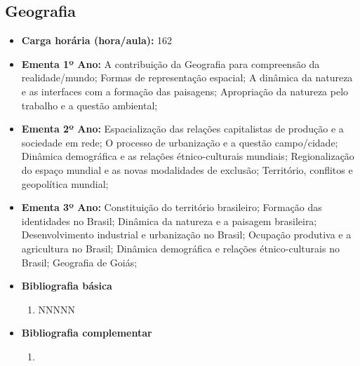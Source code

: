 \documentclass[11pt,fleqn]{book} %
\begin{document}
\subsection{Geografia}\label{disc:geografia}
\begin{itemize}
	\item \textbf{Carga horária (hora/aula):} 162
	\item \textbf{Ementa 1º Ano:} 
	A contribuição da Geografia para compreensão da realidade/mundo;
	Formas de representação espacial;
	A dinâmica da natureza e as interfaces com a formação das paisagens;
	Apropriação da natureza pelo trabalho e a questão ambiental;
	\item \textbf{Ementa 2º Ano:} 	
	Espacialização das relações capitalistas de produção e a sociedade em rede;
	O processo de urbanização e a questão campo/cidade;
	Dinâmica demográfica e as relações étnico-culturais mundiais;
	Regionalização do espaço mundial e as novas modalidades de exclusão;
	Território, conflitos e geopolítica mundial;
	\item \textbf{Ementa 3º Ano:} 	
	Constituição do território brasileiro;
	Formação das identidades no Brasil; 
	Dinâmica da natureza e a paisagem brasileira;
	Desenvolvimento industrial e urbanização no Brasil;
	Ocupação produtiva e a agricultura no Brasil; 
	Dinâmica demográfica e relações étnico-culturais no Brasil;
	Geografia de Goiás;
	\item \textbf{Bibliografia básica}
	\begin{enumerate}
		\item NNNNN
	\end{enumerate}
	\item \textbf{Bibliografia complementar}
	\begin{enumerate}
		\item 
	\end{enumerate}	
\end{itemize}

\newpage
\end{document}
